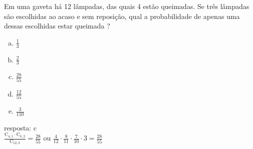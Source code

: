 \begin{ex}
 Em uma gaveta há 12 lâmpadas, das quais 4 estão queimadas. Se três lâmpadas são escolhidas ao acaso e sem reposição, qual a probabilidade de apenas uma dessas escolhidas estar queimada ?
    \begin{enumerate}[(a)]
    \item $\frac{1}{3}$
    \item $\frac{2}{3}$
    \item $\frac{28}{55}$
    \item $\frac{12}{55}$
    \item $\frac{3}{110}$ 
    \end{enumerate}
\begin{sol}
   resposta: c \\
  $\frac{\mathrm{C}_{4,1}\cdot \mathrm{C}_{8,2}}{\mathrm{C}_{{12},3}}= \frac{28}{55}$  ou $\frac{4}{12}\cdot\frac{8}{11}\cdot\frac{7}{10}\cdot3 = \frac{28}{55}$
\end{sol}
\end{ex}